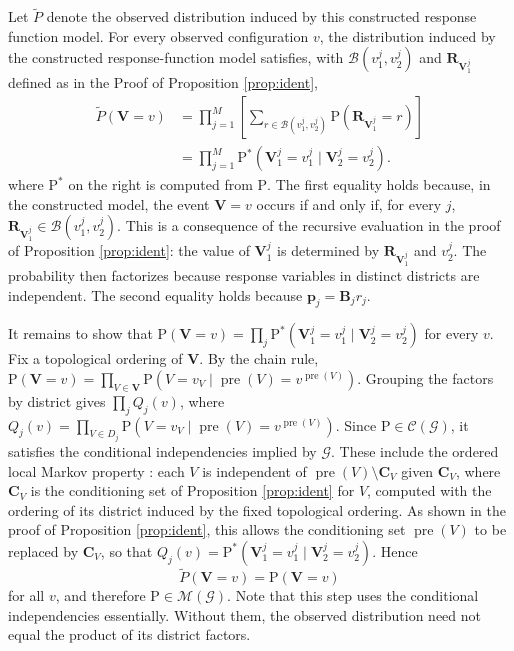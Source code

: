 \documentclass[12pt]{article}
\def\Pr{{\mathrm{P}}}
\def\Pdo{{\mathrm{P}^*}}
\newcommand{\bV}{\boldsymbol{V}}
\newcommand{\bR}{\boldsymbol{R}}
\begin{document}
Let $\widetilde{P}$ denote the observed distribution induced by this constructed response function model. For every observed configuration $v$, the distribution induced by the constructed response-function model satisfies, with $\mathcal{B}(v^j_1, v^j_2)$ and $\bR_{\bV^j_1}$ defined as in the Proof of Proposition \ref{prop:ident},
\begin{align*}
    \widetilde{P}(\bV=v) &= 
    \prod_{j=1}^M
    \left[
        \sum_{r\in\mathcal{B}(v^j_1,v^j_2)}
        \Pr(\bR_{\bV^j_1} = r)
    \right]  \\
    & = 
    \prod_{j=1}^M
    \Pdo(\bV_1^j = v^j_1 \mid \bV_2^j = v^j_2).
\end{align*}
where $\Pdo$ on the right is computed from $\Pr$. The first equality holds because, in the constructed model, the event $\bV = v$ occurs if and only if, for every $j$, $\bR_{\bV_1^j} \in \mathcal{B}(v_1^j, v_2^j)$. This is a consequence of the recursive evaluation in the proof of Proposition \ref{prop:ident}: the value of $\bV_1^j$ is determined by $\bR_{\bV_1^j}$ and $v_2^j$. The probability then factorizes because response variables in distinct districts are independent. The second equality holds because $\boldsymbol{p}_j = \boldsymbol{B}_j r_j$.

It remains to show that $\Pr(\bV = v) = \prod_{j} \Pdo(\bV_1^j = v^j_1 \mid \bV_2^j = v^j_2)$ for every $v$. Fix a topological ordering of $\bV$. By the chain rule, $\Pr(\bV = v) = \prod_{V \in \bV} \Pr(V = v_V \mid \operatorname{pre}(V) = v^{\operatorname{pre}(V)})$. Grouping the factors by district gives $\prod_j Q_j(v)$, where $Q_j(v) = \prod_{V \in D_j} \Pr(V = v_V \mid \operatorname{pre}(V) = v^{\operatorname{pre}(V)})$. Since $\Pr \in \mathcal{C}(\mathcal{G})$, it satisfies the conditional independencies implied by $\mathcal{G}$. These include the ordered local Markov property \citep{richardson2003admgs}: each $V$ is independent of $\operatorname{pre}(V) \setminus \boldsymbol{C}_V$ given $\boldsymbol{C}_V$, where $\boldsymbol{C}_V$ is the conditioning set of Proposition \ref{prop:ident} for $V$, computed with the ordering of its district induced by the fixed topological ordering. As shown in the proof of Proposition \ref{prop:ident}, this allows the conditioning set $\operatorname{pre}(V)$ to be replaced by $\boldsymbol{C}_V$, so that $Q_j(v) = \Pdo(\bV_1^j = v^j_1 \mid \bV_2^j = v^j_2)$. Hence
\[
    \widetilde{P}(\bV=v)=\Pr(\bV=v)
\]
for all $v$, and therefore $\Pr\in\mathcal{M}(\mathcal{G})$. Note that this step uses the conditional independencies essentially. Without them, the observed distribution need not equal the product of its district factors.
\end{document}
